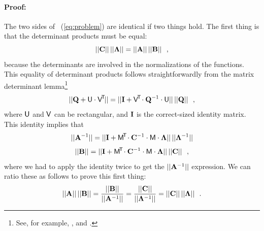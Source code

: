 \paragraph{Proof:}
The two sides of \equationname~(\ref{eq:problem}) are identical if two things
hold.
The first thing is that the determinant products must be equal:
\begin{equation}
||\mathbf{C}||\,||\mathbf{\Lambda}|| = ||\mathbf{A}||\,||\mathbf{B}||
~~,
\end{equation}
because the determinants are involved in the normalizations of the
functions.
This equality of determinant products follows straightforwardly from
the matrix determinant lemma\footnote{See, for example, \cite{Wiki:MDL}, and \cite{Harville:2011}.}
\begin{equation}\label{eq:detlemma}
||\mathbf{Q} + \mathsf{U}\cdot\mathsf{V}^{\!\mathsf{T}\!}|| = ||\mathbf{I} + \mathsf{V}^{\!\mathsf{T}\!}\cdot\mathbf{Q}^{-1}\cdot\mathsf{U}||\,||\mathbf{Q}||
~~,
\end{equation}
where $\mathsf{U}$ and $\mathsf{V}$ can be rectangular, and $\mathbf{I}$ is the correct-sized identity matrix.
This identity implies that
\begin{equation}
||\mathbf{A}^{-1}|| = ||\mathbf{I} + \mathsf{M}^{\!\mathsf{T}\!}\cdot\mathbf{C}^{-1}\cdot\mathsf{M}\cdot\mathbf{\Lambda}||\,||\mathbf{\Lambda}^{-1}||
\end{equation}
\begin{equation}
||\mathbf{B}||     = ||\mathbf{I} + \mathsf{M}^{\!\mathsf{T}\!}\cdot\mathbf{C}^{-1}\cdot\mathsf{M}\cdot\mathbf{\Lambda}||\,||\mathbf{C}||
~~,
\end{equation}
where we had to apply the identity twice to get the $||\mathbf{A}^{-1}||$ expression.
We can ratio these as follows to prove this first thing:
\begin{equation}
||\mathbf{A}||\,||\mathbf{B}||
 = \frac{||\mathbf{B}||}{||\mathbf{A}^{-1}||}
 = \frac{||\mathbf{C}||}{||\mathbf{\Lambda}^{-1}||}
 = ||\mathbf{C}||\,||\mathbf{\Lambda}||
~~.
\end{equation}

